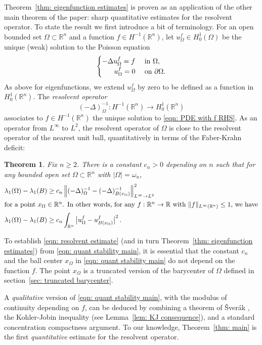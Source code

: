 \documentclass[10pt, reqno]{amsart}
\numberwithin{equation}{section}
\newtheorem{theorem}{Theorem}[section]
\def\R{{\mathbb R}}
\def\W{\Omega}
\begin{document}
Theorem~\ref{thm: eigenfunction estimates} is proven as an application of the other main theorem of the paper: sharp  quantitative estimates for the resolvent operator. To state the result we first introduce a bit of terminology. For an open bounded set $\W \subset \R^n$ and a function $f \in H^{-1}(\R^n)$, let $u_{\W}^f  \in H^{1}_0(\W)$ be the unique (weak) solution to the Poisson equation 
\begin{equation}\label{eqn: PDE with f RHS}
	\begin{cases}
	\hfill	-\Delta u^f_{\W}  = f & \text{ in } \W,\\
	\hfill	u_{\W}^f =0 & \text{ on } \partial \W.
	\end{cases}
\end{equation}
As above for eigenfunctions, we extend $u_\W^f$ by zero to be defined as a function in $H^1_0(\R^n)$. The {\it resolvent operator}
$$(-\Delta)_\W^{-1} : H^{-1}(\R^n) \to H^1_0(\R^n)$$ associates to $f \in H^{-1}(\R^n)$ the unique solution to \eqref{eqn: PDE with f RHS}. As an operator from $L^{\infty}$ to $L^2$, the resolvent operator of $\W$ is close to the resolvent operator of the nearest unit ball, quantitatively in terms of the Faber-Krahn deficit:
\begin{theorem}\label{thm: resolvent}\label{thm: main}
Fix $n\geq 2$. There is a constant $c_{n}>0$ depending on $n$ such that  for any bounded open set $\W \subset \R^n$ with $|\W| = \omega_n$,
\begin{align}
    \label{eqn: resolvent estimate}
  \lambda_1(\W ) - \lambda_1(B)  & \geq c_{n} \left\| (-\Delta)_{\W}^{-1} -(-\Delta)_{B(x_\W)}^{-1}\right\|^2_{L^{\infty}\to L^2}\,\\
\intertext{for a point $x_\W \in \R^n$. In other words, for any $f:\R^n \to \R$ with $\|f\|_{L^{\infty}(\R^n)}\leq 1,$ we have}
\label{eqn: quant stability main}
 \lambda_1(\W ) - \lambda_1(B)  & \geq c_{n}\int_{\R^n} \big|u_{\W}^f - u_{B(x_\W)}^f\big|^2 \,.   
\end{align}
\end{theorem}
To establish \eqref{eqn: resolvent estimate} (and in turn Theorem~\ref{thm: eigenfunction estimates}) from \eqref{eqn: quant stability main}, it is essential that the constant $c_{n}$ and the ball center  $x_\W$ in \eqref{eqn: quant stability main} do not depend on the function $f$. The point $x_\W$  is a truncated version of the barycenter of $\W$ defined  in section~\ref{sec: truncated barycenter}. 


A {\it  qualitative} version of \eqref{eqn: quant stability main}, with the modulus of continuity depending on $f$, can be deduced by combining a theorem of \v{S}ver\'{a}k  \cite[Theorem 3.2.5]{hp18}, the Kohler-Jobin inequality (see Lemma~\ref{lem: KJ consequence}), and a standard concentration compactness argument. To our knowledge, Theorem~\ref{thm: main} is the first {\it quantitative} estimate for the  resolvent operator.
\end{document}
